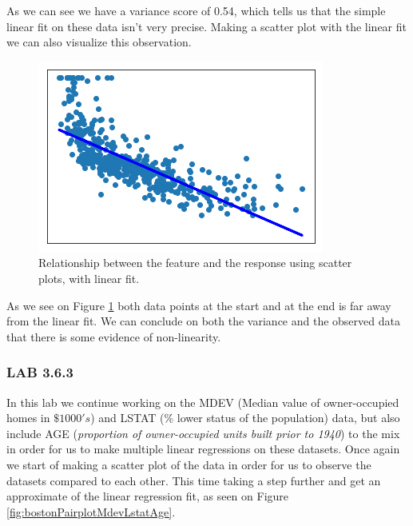 As we can see we have a variance score of 0.54, which tells us that the simple linear fit on these data isn't very precise. Making a scatter plot with the linear fit we can also visualize this observation.

\begin{figure}[h]
	\centering
	\includegraphics[scale=0.6]{regression/multipleLinearRegression/fig/bostonScatterplotMdevLstatLinreg.png}
	\caption{Relationship between the feature and the response using scatter plots, with linear fit.}
	\label{fig:bostonScatterplotMdevLstatLinreg}
\end{figure}

As we see on Figure \ref{fig:bostonScatterplotMdevLstatLinreg} both data points at the start and at the end is far away from the linear fit. We can conclude on both the variance and the observed data that there is some evidence of non-linearity.

\subsubsection*{LAB 3.6.3}
In this lab we continue working on the MDEV (Median value of owner-occupied homes in $\$1000's$) and LSTAT (\% lower status of the population) data, but also include AGE (\textit{proportion of owner-occupied units built prior to 1940}) to the mix in order for us to make multiple linear regressions on these datasets. Once again we start of making a scatter plot of the data in order for us to observe the datasets compared to each other. This time taking a step further and get an approximate of the linear regression fit, as seen on Figure \ref{fig:bostonPairplotMdevLstatAge}.

